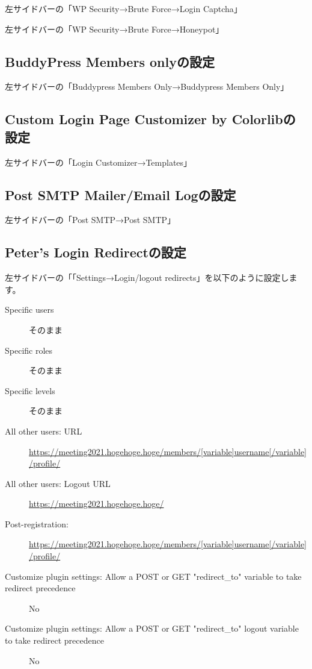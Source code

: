 \documentclass[titlepage,10pt,a4paper,uplatex]{jsbook}
\begin{document}
左サイドバーの「WP Security→Brute Force→Login Captcha」

左サイドバーの「WP Security→Brute Force→Honeypot」

\subsection{BuddyPress Members onlyの設定}

左サイドバーの「Buddypress Members Only→Buddypress Members Only」

\subsection{Custom Login Page Customizer by Colorlibの設定}

左サイドバーの「Login Customizer→Templates」

\subsection{Post SMTP Mailer/Email Logの設定}

左サイドバーの「Post SMTP→Post SMTP」

\subsection{Peter's Login Redirectの設定}

左サイドバーの「「Settings→Login/logout redirects」を以下のように設定します。

\begin{description}
\item[Specific users] そのまま
\item[Specific roles] そのまま
\item[Specific levels] そのまま
\item[All other users: URL] \url{https://meeting2021.hogehoge.hoge/members/[variable]username[/variable]/profile/}
\item[All other users: Logout URL] \url{https://meeting2021.hogehoge.hoge/}
\item[Post-registration: ] \url{https://meeting2021.hogehoge.hoge/members/[variable]username[/variable]/profile/}
\item[Customize plugin settings: Allow a POST or GET "redirect\_to" variable to take redirect precedence] No
\item[Customize plugin settings: Allow a POST or GET "redirect\_to" logout variable to take redirect precedence] No
\end{description}
\end{document}

